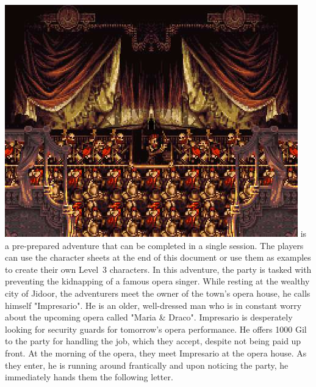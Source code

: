 %
%
\vfill
%
\includegraphics[width=\columnwidth]{./art/mariaanddraco/opera.jpg}
%
\vfill
%
 is a pre-prepared adventure that can be completed in a single session.
The players can use the character sheets at the end of this document or use them as examples to create their own Level~3 characters. 
In this adventure, the party is tasked with preventing the kidnapping of a famous opera singer.
%
\vfill
%
%
\vfill
%
While resting at the wealthy city of Jidoor, the adventurers meet the owner of the town's opera house, he calls himself "Impresario".
He is an older, well-dressed man who is in constant worry about the upcoming opera called "Maria \& Draco".
Impresario is desperately looking for security guards for tomorrow's opera performance.
He offers 1000 Gil to the party for handling the job, which they accept, despite not being paid up front.
At the morning of the opera, they meet Impresario at the opera house.
As they enter, he is running around frantically and upon noticing the party, he immediately hands them the following letter.\\\\
